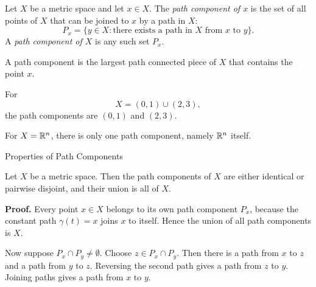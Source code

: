 \documentclass[12pt, a4paper]{article}
\begin{document}
\vspace{10pt}

\begin{definition}
Let $X$ be a metric space and let $x\in X$. The \textit{path component of $x$} is the set of all points of $X$ that can be joined to $x$ by a path in $X$:
\[
    P_x=\{y\in X: \text{there exists a path in }X\text{ from }x\text{ to }y\}.
\]
A \textit{path component of $X$} is any such set $P_x$.
\end{definition}

\vfill

\begin{problem}[Remark]
A path component is the largest path connected piece of $X$ that contains the point $x$.
\end{problem}

\clearpage

\begin{problem}
For
\[
    X=(0,1)\cup(2,3),
\]
the path components are $(0,1)$ and $(2,3)$.
\end{problem}

\vspace{300pt}

\begin{problem}
For $X=\mathbb{R}^n$, there is only one path component, namely $\mathbb{R}^n$ itself.
\end{problem}

\clearpage

\begin{heading}
    Properties of Path Components
\end{heading}

\vspace{10pt}

\begin{theorem}
Let $X$ be a metric space. Then the path components of $X$ are either identical or pairwise disjoint, and their union is all of $X$.
\end{theorem}

\textbf{Proof.}
Every point $x\in X$ belongs to its own path component $P_x$, because the constant path $\gamma(t)=x$ joins $x$ to itself. Hence the union of all path components is $X$.

Now suppose $P_x\cap P_y\neq\emptyset$. Choose $z\in P_x\cap P_y$. Then there is a path from $x$ to $z$ and a path from $y$ to $z$. Reversing the second path gives a path from $z$ to $y$. Joining paths gives a path from $x$ to $y$.
\end{document}
